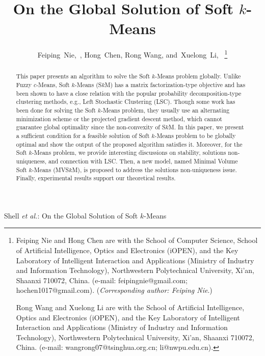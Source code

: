 \documentclass[journal]{IEEEtran}
\begin{document}
\title{On the Global Solution of Soft $k$-Means}


\author{Feiping~Nie,~, Hong~Chen, Rong Wang, and~Xuelong~Li,~%
\thanks{Feiping Nie and Hong Chen are with the School of Computer Science, School of Artificial Intelligence, Optics and Electronics (iOPEN), and the Key Laboratory of Intelligent Interaction and Applications (Ministry of Industry and Information Technology), Northwestern Polytechnical University, Xi'an, Shaanxi 710072, China. (e-mail: feipingnie@gmail.com; hochen1017@gmail.com). (\textit{Corresponding author: Feiping Nie}.)
	
Rong Wang and Xuelong Li are with the School of Artificial Intelligence, Optics and Electronics (iOPEN), and the Key Laboratory of Intelligent Interaction and Applications (Ministry of Industry and Information Technology), Northwestern Polytechnical University, Xi'an, Shaanxi 710072, China. (e-mail: wangrong07@tsinghua.org.cn; li@nwpu.edu.cn).}}

\markboth{}%
{Shell \MakeLowercase{\textit{et al.}}: On the Global Solution of Soft $k$-Means}

\maketitle

\begin{abstract}
This paper presents an algorithm to solve the Soft $k$-Means problem globally.
Unlike Fuzzy $c$-Means, Soft $k$-Means (S$k$M) has a matrix factorization-type objective and 
has been shown to have a close relation with the popular probability decomposition-type clustering methods, 
e.g., Left Stochastic Clustering (LSC).
Though some work has been done for solving the Soft $k$-Means problem,
they usually use an alternating minimization scheme or the projected gradient descent method, 
which cannot guarantee global optimality since the non-convexity of S$k$M.
In this paper, we present a sufficient condition for a feasible solution of Soft $k$-Means problem to be globally optimal
and show the output of the proposed algorithm satisfies it.
Moreover, for the Soft $k$-Means problem, we provide interesting discussions on 
stability, solutions non-uniqueness, and connection with LSC.
Then, a new model, named Minimal Volume Soft $k$-Means (MVS$k$M), is proposed to address the solutions non-uniqueness issue.
Finally, experimental results support our theoretical results.
\end{abstract}
\end{document}
